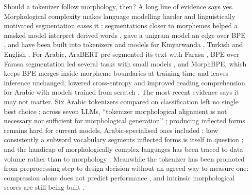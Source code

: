 Should a tokenizer follow morphology, then? A long line of evidence says yes. Morphological complexity makes language
modelling harder and linguistically motivated segmentation eases it \citep{park-2021-morphology}; segmentations closer
to morphemes helped a masked model interpret derived words \citep{hofmann-2021-superbizarre}, gave a unigram model an
edge over BPE \citep{bostrom-2020-bpe}, and have been built into tokenizers and models for Kinyarwanda
\citep{nzeyimana-2022-kinyabert}, Turkish \citep{toraman-2023-tokenization} and English
\citep{jabbar-2023-morphpiece,bauwens-2024-bpeknockout,libovicky-2024-lexically}. For Arabic, AraBERT pre-segmented its
text with Farasa \citep{antoun-2020-arabert}, BPE over Farasa segmentation led several tasks with small models
\citep{alrefaie2024exploring}, and MorphBPE, which keeps BPE merges inside morpheme boundaries at training time and
leaves inference unchanged, lowered cross-entropy and improved reading comprehension for Arabic with models trained from
scratch \citep{asgari2025morphbpe,asgari-2026-morphbpe}. The most recent evidence says it may not matter. Six Arabic
tokenizers compared on classification left no single best choice \citep{alyafeai-2023-tokenizers}; across seven LLMs,
``tokenizer morphological alignment is not necessary nor sufficient for morphological generation''
\citep{alakeel2026morphemes}; producing inflected forms remains hard for current models, Arabic-specialised ones
included \citep{reda2026yallamorph}; how consistently a subword vocabulary segments inflected forms is itself in
question \citep{dimarco-2024-subword}; and the handicap of morphologically complex languages has been traced to data
volume rather than to morphology \citep{arnett-2025-morphology}. Meanwhile the tokenizer has been promoted from
preprocessing step to design decision
\citep{rust-etal-2021-good,ali-2024-tokenizer,dagan-2024-tokenizer,alqahtani-2026-tokenizers} without an agreed way to
measure one: compression alone does not predict performance
\citep{goldman-2024-unpacking,schmidt-2024-compression,lotz-2025-beyondcompression}, and intrinsic morphological scores
are still being built \citep{batsuren-2024-alien,uzan-2024-greed}.

